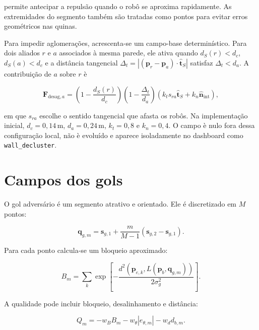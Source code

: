 \documentclass[12pt,a4paper]{article}
\newcommand{\vect}[1]{\boldsymbol{#1}}
\newcommand{\unit}[1]{\widehat{\vect{#1}}}
\begin{document}
permite antecipar a repuls\~ao quando o rob\^o se aproxima rapidamente. As extremidades do segmento tamb\'em s\~ao tratadas como pontos para evitar erros geom\'etricos nas quinas.

Para impedir aglomera\c{c}\~oes, acrescenta-se um campo-base determin\'istico. Para
dois aliados $r$ e $a$ associados \`a mesma parede, ele ativa quando
$d_S(r)<d_c$, $d_S(a)<d_c$ e a dist\^ancia tangencial
$\Delta_t=|(\vect{p}_r-\vect{p}_a)\cdot\unit{t}_S|$ satisfaz
$\Delta_t<d_a$. A contribui\c{c}\~ao de $a$ sobre $r$ \`e

\begin{equation}
 \vect{F}_{\mathrm{desag},a}=
 \left(1-\frac{d_S(r)}{d_c}\right)
 \left(1-\frac{\Delta_t}{d_a}\right)
 \left(k_t s_{ra}\unit{t}_S+k_n\unit{n}_{\mathrm{int}}\right),
\end{equation}

em que $s_{ra}$ escolhe o sentido tangencial que afasta os rob\^os. Na
implementa\c{c}\~ao inicial, $d_c=0{,}14\,\mathrm{m}$,
$d_a=0{,}24\,\mathrm{m}$, $k_t=0{,}8$ e $k_n=0{,}4$. O campo \`e nulo fora
dessa configura\c{c}\~ao local, n\~ao \`e evolu\'ido e aparece isoladamente no
dashboard como \texttt{wall\_decluster}.

\section{Campos dos gols}

O gol advers\'ario \'e um segmento atrativo e orientado. Ele \'e discretizado em $M$ pontos:

\begin{equation}
  \vect{q}_{g,m}=\vect{s}_{g,1}+\frac{m}{M-1}(\vect{s}_{g,2}-\vect{s}_{g,1}).
\end{equation}

Para cada ponto calcula-se um bloqueio aproximado:

\begin{equation}
  B_m=\sum_k\exp\left[-\frac{d^2(\vect{p}_{e,k},L(\vect{p}_b,\vect{q}_{g,m}))}{2\sigma_g^2}\right].
\end{equation}

A qualidade pode incluir bloqueio, desalinhamento e dist\^ancia:

\begin{equation}
  Q_m=-w_BB_m-w_\theta|e_{\theta,m}|-w_dd_{b,m}.
\end{equation}
\end{document}
